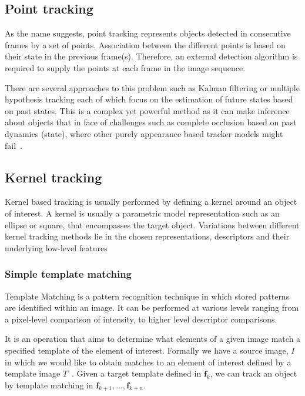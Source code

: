 
\subsection{Point tracking}\label{literature_review_point}
As the name suggests, point tracking represents objects detected in consecutive
frames by a set of points. Association between the different points is based on
their state in the previous frame(s). Therefore, an external detection algorithm
is required to supply the points at each frame in the image sequence.

There are several approaches to this problem such as Kalman filtering or
multiple hypothesis tracking each of which focus on the estimation of future
states based on past states. This is a complex yet powerful method as it can
make inference about objects that in face of challenges such as complete
occlusion based on past dynamics (state), where other purely appearance based tracker
models might fail~\cite{Shantaiya2013,Prajapati2015}.

\subsection{Kernel tracking}\label{literature_review_kernel}
Kernel based tracking is usually performed by defining a kernel around an object
of interest. A kernel is usually a parametric model representation such as an
ellipse or square, that encompasses the target object. 
Variations between different kernel tracking methods lie in the chosen representations,
descriptors and their underlying low-level features~\cite{Prajapati2015}

\subsubsection{Simple template matching}
Template Matching is a pattern recognition technique in which stored patterns 
are identified within an image. It can be performed at various levels ranging
from a pixel-level comparison of intensity, to higher level descriptor comparisons.

It is an operation that aims to determine what elements of a given image match a
specified template of the element of interest. Formally we have a source image,
$I$ in which we would like to obtain matches to an element of interest defined
by a template image $T$~\cite{Brunelli}. 
Given a target template defined in $\mathbf{f}_k$, we can track an object by 
template matching in $\mathbf{f}_{k+1},\ldots,\mathbf{f}_{k+n}$.


